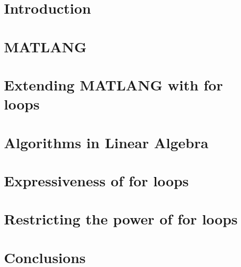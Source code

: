 \documentclass[acmsmall,review]{acmart}
\begin{document}
 




\maketitle

\section{Introduction}



\section{MATLANG}\label{sec:matlang}


\section{Extending MATLANG with for loops}\label{sec:formatlang}



%

\section{Algorithms in Linear Algebra}\label{sec:queries}


\section{Expressiveness of for loops}\label{sec:circuits}



\section{Restricting the power of for loops}\label{sec:restrict}


\section{Conclusions}\label{sec:conclude}

\end{document}
